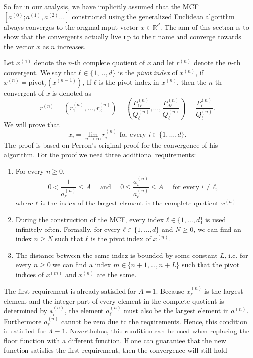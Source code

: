 So far in our analysis, we have implicitly assumed that the MCF $[a^{(0)}; a^{(1)}, a^{(2)} …]$
constructed using the generalized Euclidean algorithm always converges to the
original input vector $x ∈ ℝ^d$.
The aim of this section is to show that the convergents actually live up to
their name and converge towards the vector $x$ as $n$ increases.

Let $x^{(n)}$ denote the $n$-th complete quotient of $x$
and let $r^{(n)}$ denote the $n$-th convergent.
We say that $ℓ ∈ \{1, …, d\}$ is the \emph{pivot index} of $x^{(n)}$,
if $x^{(n)} = \mathrm{pivot}_ℓ(x^{(n-1)})$,
If $ℓ$ is the pivot index in $x^{(n)}$,
then the $n$-th convergent of $x$ is denoted as
\[
  r^{(n)}
  = (r_1^{(n)}, …, r_d^{(n)})
  = \left( \frac{P_{1ℓ}^{(n)}}{Q_ℓ^{(n)}}, \dots, \frac{P_{dℓ}^{(n)}}{Q_ℓ^{(n)}} \right)
  = \frac{P_ℓ^{(n)}}{Q_ℓ^{(n)}}.
\]
We will prove that
\[
  x_i = \lim_{n → ∞} r_i^{(n)} \text{ for every } i ∈ \{1, …, d\}.
\]
The proof is based on Perron's original proof \cite{Perron07} for the
convergence of his algorithm.
For the proof we need three additional requirements:
\begin{enumerate}
  \item
    For every $n ≥ 0$,
    \[
      0 < \frac{1}{a_ℓ^{(n)}} ≤ A
      \quad \text{ and } \quad
      0 ≤ \frac{a_i^{(n)}}{a_ℓ^{(n)}} ≤ A \quad \text{ for every } i ≠ ℓ,
    \]
    where $ℓ$ is the index of the largest element in the complete quotient $x^{(n)}$.
  \item
    During the construction of the MCF,
    every index $ℓ ∈ \{1, …, d\}$ is used infinitely often.
    Formally, for every $ℓ ∈ \{1, …, d\}$ and $N ≥ 0$,
    we can find an index $n ≥ N$ such that $ℓ$ is the pivot index of $x^{(n)}$.
  \item
    The distance between the same index is bounded by some constant $L$,
    i.e. for every $n ≥ 0$ we can find a index $m ∈ \{n+1, …, n+L\}$ such that
    the pivot indices of $x^{(m)}$ and $x^{(n)}$ are the same.
\end{enumerate}

The first requirement is already satisfied for $A = 1$.
Because $x_ℓ^{(n)}$ is the largest element
and the integer part of every element in the complete quotient is determined by $a_i^{(n)}$,
the element $a_ℓ^{(n)}$ must also be the largest element in $a^{(n)}$.
Furthermore $a_ℓ^{(n)}$ cannot be zero due to the requirements.
Hence, this condition is satisfied for $A = 1$.
Nevertheless,
this condition can be used when replacing the floor function with a different function.
If one can guarantee that the new function satisfies the first requirement,
then the convergence will still hold.

